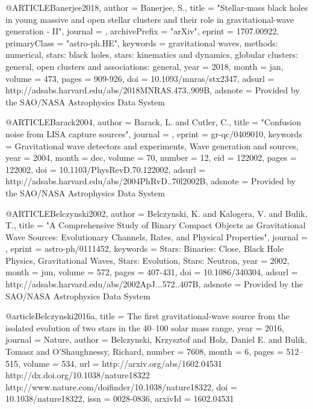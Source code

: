 \documentclass[twocolumn,tighten]{aastex63}
\begin{document}
{{{{{@ARTICLE{Banerjee2018,
   author = {{Banerjee}, S.},
    title = "{Stellar-mass black holes in young massive and open stellar clusters and their role in gravitational-wave generation - II}",
  journal = {\mnras},
archivePrefix = "arXiv",
   eprint = {1707.00922},
 primaryClass = "astro-ph.HE",
 keywords = {gravitational waves, methods: numerical, stars: black holes, stars: kinematics and dynamics, globular clusters: general, open clusters and associations: general},
     year = 2018,
    month = jan,
   volume = 473,
    pages = {909-926},
      doi = {10.1093/mnras/stx2347},
   adsurl = {http://adsabs.harvard.edu/abs/2018MNRAS.473..909B},
  adsnote = {Provided by the SAO/NASA Astrophysics Data System}
}

@ARTICLE{Barack2004,
   author = {{Barack}, L. and {Cutler}, C.},
    title = "{Confusion noise from LISA capture sources}",
  journal = {\prd},
   eprint = {gr-qc/0409010},
 keywords = {Gravitational wave detectors and experiments, Wave generation and sources},
     year = 2004,
    month = dec,
   volume = 70,
   number = 12,
      eid = {122002},
    pages = {122002},
      doi = {10.1103/PhysRevD.70.122002},
   adsurl = {http://adsabs.harvard.edu/abs/2004PhRvD..70l2002B},
  adsnote = {Provided by the SAO/NASA Astrophysics Data System}
}

@ARTICLE{Belczynski2002,
   author = {{Belczynski}, K. and {Kalogera}, V. and {Bulik}, T.},
    title = "{A Comprehensive Study of Binary Compact Objects as Gravitational Wave Sources: Evolutionary Channels, Rates, and Physical Properties}",
  journal = {\apj},
   eprint = {astro-ph/0111452},
 keywords = {Stars: Binaries: Close, Black Hole Physics, Gravitational Waves, Stars: Evolution, Stars: Neutron},
     year = 2002,
    month = jun,
   volume = 572,
    pages = {407-431},
      doi = {10.1086/340304},
   adsurl = {http://adsabs.harvard.edu/abs/2002ApJ...572..407B},
  adsnote = {Provided by the SAO/NASA Astrophysics Data System}
}

@article{Belczynski2016a,
    title = {{The first gravitational-wave source from the isolated evolution of two stars in the 40–100 solar mass range}},
    year = {2016},
    journal = {Nature},
    author = {Belczynski, Krzysztof and Holz, Daniel E. and Bulik, Tomasz and O’Shaughnessy, Richard},
    number = {7608},
    month = {6},
    pages = {512--515},
    volume = {534},
    url = {http://arxiv.org/abs/1602.04531 http://dx.doi.org/10.1038/nature18322 http://www.nature.com/doifinder/10.1038/nature18322},
    doi = {10.1038/nature18322},
    issn = {0028-0836},
    arxivId = {1602.04531}
}

}}}}}
\end{document}
